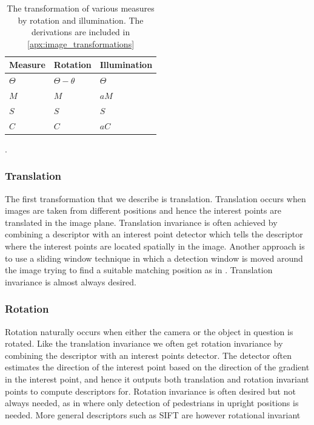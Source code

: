 \documentclass[thesis.tex]{subfiles}
\begin{document}

\begin{table}
\centering
\begin{tabular}{@{}l|ll@{}}
Measure & Rotation & Illumination \\
\hline
$\Theta$ & $\Theta - \theta $ & $\Theta$ \\
$M$ & $M$ & $a M$ \\
$S$ & $S$ & $S$ \\
$C$ & $C$ & $a C$ \\
\end{tabular}
\caption{The transformation of various measures by rotation and illumination. The derivations are included in \cref{apx:image_transformations}}.
\end{table}

\subsubsection{Translation}
The first transformation that we describe is translation. Translation occurs when images are taken from different positions and hence the interest points are translated in the image plane. Translation invariance is often achieved by combining a descriptor with an interest point detector which tells the descriptor where the interest points are located spatially in the image. Another approach is to use a sliding window technique in which a detection window is moved around the image trying to find a suitable matching position as in \cite{felzenszwalb2008discriminatively}. Translation invariance is almost always desired.


\subsubsection{Rotation}
Rotation naturally occurs when either the camera or the object in question is rotated. Like the translation invariance we often get rotation invariance by combining the descriptor with an interest points detector. The detector often estimates the direction of the interest point based on the direction of the gradient in the interest point, and hence it outputs both translation and rotation invariant points to compute descriptors for. Rotation invariance is often desired but not always needed, as in \cite{dalal2005histograms,felzenszwalb2008discriminatively} where only detection of pedestrians in upright positions is needed. More general descriptors such as SIFT are however rotational invariant
\end{document}
